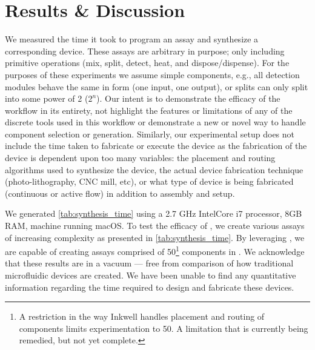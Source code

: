\section{Results \& Discussion}
\label{sec:results_discussion}

We measured the time it took to program an assay and synthesize a corresponding device.
These assays are arbitrary in purpose; only including primitive operations (\textsf{mix}, \textsf{split}, \textsf{detect}, \textsf{heat}, and \textsf{dispose}/\textsf{dispense}).
For the purposes of these experiments we assume simple components, e.g., all detection modules behave the same in form (one input, one output), or splits can only split into some power of 2 ($2^n$).
Our intent is to demonstrate the efficacy of the workflow in its entirety, not highlight the features or limitations of any of the discrete tools used in this workflow or demonstrate a new or novel way to handle component selection or generation.
Similarly, our experimental setup does not include the time taken to fabricate or execute the device as the fabrication of the device is dependent upon too many variables: the placement and routing algorithms used to synthesize the device, the actual device fabrication technique (photo-lithography, CNC mill, etc), or what type of device is being fabricated (continuous or active flow) in addition to assembly and setup.

We generated \cref{tab:synthesis_time} using a 2.7 GHz Intel\texttrademark Core i7 processor, 8GB RAM, machine running macOS\texttrademark.
To test the efficacy of \tool{}, we create various assays of increasing complexity as presented in \cref{tab:synthesis_time}.
By leveraging \tool{}, we are capable of creating assays comprised of 50\footnote{A restriction in the way Inkwell handles placement and routing of components limits experimentation to 50.  A limitation that is currently being remedied, but not yet complete.} components in .
We acknowledge that these results are in a vacuum --- free from comparison of how traditional microfluidic devices are created.
We have been unable to find any quantitative information regarding the time required to design and fabricate these devices.

